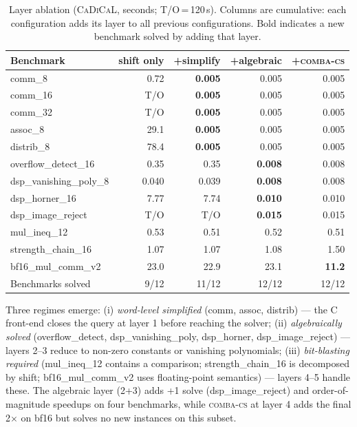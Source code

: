 \documentclass[runningheads]{llncs}
\newcommand{\combacs}{\textsc{comba-cs}\xspace}
\newcommand{\cadical}{\textsc{CaDiCaL}\xspace}
\begin{document}
\begin{table}[ht]
\caption{Layer ablation (\cadical, seconds; T/O\,=\,120\,s).
  Columns are cumulative: each configuration adds its layer to
  all previous configurations. Bold indicates a new benchmark
  solved by adding that layer.}
\label{tab:ablation}
\centering
\small
\begin{tabular}{lrrrr}
\toprule
Benchmark & shift only & +simplify & +algebraic & +\combacs \\
\midrule
comm\_8 & 0.72 & \textbf{0.005} & 0.005 & 0.005 \\
comm\_16 & T/O & \textbf{0.005} & 0.005 & 0.005 \\
comm\_32 & T/O & \textbf{0.005} & 0.005 & 0.005 \\
assoc\_8 & 29.1 & \textbf{0.005} & 0.005 & 0.005 \\
distrib\_8 & 78.4 & \textbf{0.005} & 0.005 & 0.005 \\
overflow\_detect\_16 & 0.35 & 0.35 & \textbf{0.008} & 0.008 \\
dsp\_vanishing\_poly\_8 & 0.040 & 0.039 & \textbf{0.008} & 0.008 \\
dsp\_horner\_16 & 7.77 & 7.74 & \textbf{0.010} & 0.010 \\
dsp\_image\_reject & T/O & T/O & \textbf{0.015} & 0.015 \\
mul\_ineq\_12 & 0.53 & 0.51 & 0.52 & 0.51 \\
strength\_chain\_16 & 1.07 & 1.07 & 1.08 & 1.50 \\
bf16\_mul\_comm\_v2 & 23.0 & 22.9 & 23.1 & \textbf{11.2} \\
\midrule
Benchmarks solved & 9/12 & 11/12 & 12/12 & 12/12 \\
\bottomrule
\end{tabular}
\end{table}

Three regimes emerge: (i) \emph{word-level simplified}
(comm, assoc, distrib) — the C front-end closes the query at
layer 1 before reaching the solver; (ii) \emph{algebraically
solved} (overflow\_detect, dsp\_vanishing\_poly, dsp\_horner,
dsp\_image\_reject) — layers 2--3 reduce to non-zero constants or
vanishing polynomials; (iii) \emph{bit-blasting required}
(mul\_ineq\_12 contains a comparison; strength\_chain\_16 is
decomposed by shift; bf16\_mul\_comm\_v2 uses floating-point
semantics) — layers 4--5 handle these. The algebraic layer
(2+3) adds +1 solve (dsp\_image\_reject) and order-of-magnitude
speedups on four benchmarks, while \combacs at layer 4 adds the
final 2$\times$ on bf16 but solves no new instances on this
subset.
\end{document}

